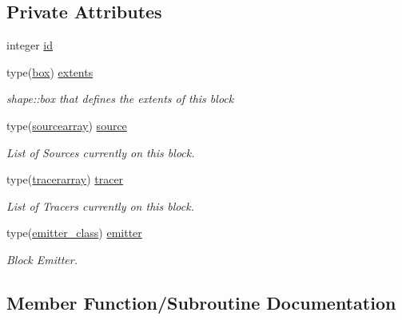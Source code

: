 \subsection*{Private Attributes}
\begin{DoxyCompactItemize}
\item 
integer \hyperlink{structblocks__mod_1_1block__class_addd1a493d56aa1ffd1bc27c56b682065}{id}
\item 
type(\hyperlink{structgeometry__mod_1_1box}{box}) \hyperlink{structblocks__mod_1_1block__class_aff3b0cb7d8248f8a87691a028de916d3}{extents}
\begin{DoxyCompactList}\small\item\em shape\+::box that defines the extents of this block \end{DoxyCompactList}\item 
type(\hyperlink{structsources__array__mod_1_1sourcearray}{sourcearray}) \hyperlink{structblocks__mod_1_1block__class_a398a25c84b76ebe336c1384552bda602}{source}
\begin{DoxyCompactList}\small\item\em List of Sources currently on this block. \end{DoxyCompactList}\item 
type(\hyperlink{structtracer__array__mod_1_1tracerarray}{tracerarray}) \hyperlink{structblocks__mod_1_1block__class_ac1deffab20b882618041f0dcc0e58c22}{tracer}
\begin{DoxyCompactList}\small\item\em List of Tracers currently on this block. \end{DoxyCompactList}\item 
type(\hyperlink{structemitter__mod_1_1emitter__class}{emitter\+\_\+class}) \hyperlink{structblocks__mod_1_1block__class_a55e85183ba871abcaba1c00d5393611f}{emitter}
\begin{DoxyCompactList}\small\item\em Block Emitter. \end{DoxyCompactList}\end{DoxyCompactItemize}


\subsection{Member Function/\+Subroutine Documentation}
\mbox{\label{structblocks__mod_1_1block__class_ad671745ca5dc3227ddb0ed1d9ff45268}} 
